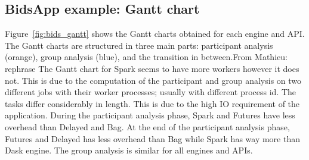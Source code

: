 \documentclass[conference]{IEEEtran}
\newcommand{\MD}[1]{\color{magenta}From Mathieu: #1 \color{black}}
\begin{document}
\subsection{BidsApp example: Gantt chart}
Figure~\ref{fig:bids_gantt} shows the Gantt charts obtained for each engine and API.
The Gantt charts are structured in three main parts: participant analysis (orange),
group analysis (blue), and the transition in between.\MD{rephrase} The Gantt chart
for Spark seems to have more workers however it does not. This is due to the
computation of the participant and group analysis on two different jobs with their
worker processes; usually with different process id. The tasks differ considerably in
length. This is due to the high IO requirement of the application. During the
participant analysis phase, Spark and Futures have less overhead than Delayed and
Bag. At the end of the participant analysis phase, Futures and Delayed has less
overhead than Bag while Spark has way more than Dask engine. The group analysis is
similar for all engines and APIs.
\end{document}

